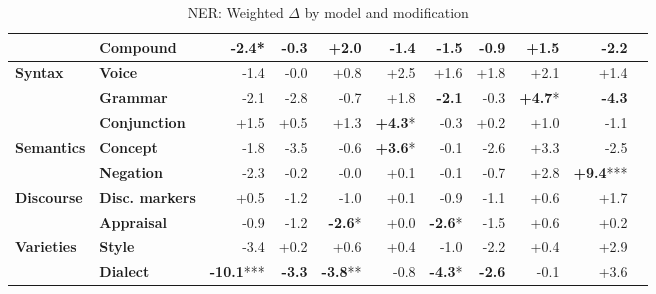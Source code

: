 \begin{table}[h]
{\begin{tabular}{llrrrrrrrrr}
  & \textbf{Compound} & \cellcolor{red!4} \textbf{-2.4}* & \cellcolor{red!0} -0.3 & \cellcolor{green!4} +2.0 & \cellcolor{red!2} -1.4 & \cellcolor{red!2} -1.5 & \cellcolor{red!1} -0.9 & \cellcolor{green!2} +1.5 & \cellcolor{red!4} -2.2 \\
\midrule
\textbf{Syntax} & \textbf{Voice} & \cellcolor{red!2} -1.4 & \cellcolor{red!0} -0.0 & \cellcolor{green!1} +0.8 & \cellcolor{green!4} +2.5 & \cellcolor{green!3} +1.6 & \cellcolor{green!3} +1.8 & \cellcolor{green!4} +2.1 & \cellcolor{green!2} +1.4 \\
  & \textbf{Grammar} & \cellcolor{red!4} -2.1 & \cellcolor{red!5} -2.8 & \cellcolor{red!1} -0.7 & \cellcolor{green!3} +1.8 & \cellcolor{red!4} \textbf{-2.1} & \cellcolor{red!0} -0.3 & \cellcolor{green!9} \textbf{+4.7}* & \cellcolor{red!8} \textbf{-4.3} \\
  & \textbf{Conjunction} & \cellcolor{green!3} +1.5 & \cellcolor{green!1} +0.5 & \cellcolor{green!2} +1.3 & \cellcolor{green!8} \textbf{+4.3}* & \cellcolor{red!0} -0.3 & \cellcolor{green!0} +0.2 & \cellcolor{green!1} +1.0 & \cellcolor{red!2} -1.1 \\
\midrule
\textbf{Semantics} & \textbf{Concept} & \cellcolor{red!3} -1.8 & \cellcolor{red!6} -3.5 & \cellcolor{red!1} -0.6 & \cellcolor{green!7} \textbf{+3.6}* & \cellcolor{red!0} -0.1 & \cellcolor{red!5} -2.6 & \cellcolor{green!6} +3.3 & \cellcolor{red!4} -2.5 \\
  & \textbf{Negation} & \cellcolor{red!4} -2.3 & \cellcolor{red!0} -0.2 & \cellcolor{red!0} -0.0 & \cellcolor{green!0} +0.1 & \cellcolor{red!0} -0.1 & \cellcolor{red!1} -0.7 & \cellcolor{green!5} +2.8 & \cellcolor{green!18} \textbf{+9.4}*** \\
\midrule
\textbf{Discourse} & \textbf{Disc. markers} & \cellcolor{green!1} +0.5 & \cellcolor{red!2} -1.2 & \cellcolor{red!2} -1.0 & \cellcolor{green!0} +0.1 & \cellcolor{red!1} -0.9 & \cellcolor{red!2} -1.1 & \cellcolor{green!1} +0.6 & \cellcolor{green!3} +1.7 \\
  & \textbf{Appraisal} & \cellcolor{red!1} -0.9 & \cellcolor{red!2} -1.2 & \cellcolor{red!5} \textbf{-2.6}* & \cellcolor{green!0} +0.0 & \cellcolor{red!5} \textbf{-2.6}* & \cellcolor{red!3} -1.5 & \cellcolor{green!1} +0.6 & \cellcolor{green!0} +0.2 \\
\midrule
\textbf{Varieties} & \textbf{Style} & \cellcolor{red!6} -3.4 & \cellcolor{green!0} +0.2 & \cellcolor{green!1} +0.6 & \cellcolor{green!0} +0.4 & \cellcolor{red!2} -1.0 & \cellcolor{red!4} -2.2 & \cellcolor{green!0} +0.4 & \cellcolor{green!5} +2.9 \\
  & \textbf{Dialect} & \cellcolor{red!20} \textbf{-10.1}*** & \cellcolor{red!6} \textbf{-3.3} & \cellcolor{red!7} \textbf{-3.8}** & \cellcolor{red!1} -0.8 & \cellcolor{red!8} \textbf{-4.3}* & \cellcolor{red!5} \textbf{-2.6} & \cellcolor{red!0} -0.1 & \cellcolor{green!7} +3.6 \\
\bottomrule
\end{tabular}}
\caption{NER: Weighted $\Delta$ by model and modification}\label{tab:ner_delta}
\end{table}